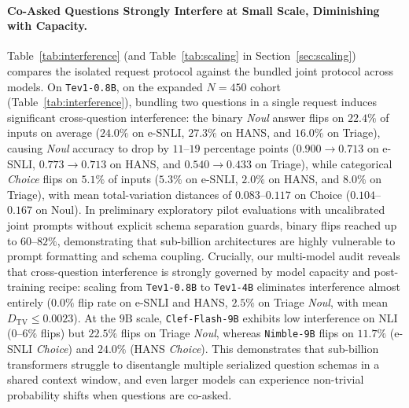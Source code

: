 \documentclass[10pt]{article}
\begin{document}
\paragraph{Co-Asked Questions Strongly Interfere at Small Scale, Diminishing with Capacity.}
Table~\ref{tab:interference} (and Table~\ref{tab:scaling} in Section~\ref{sec:scaling}) compares the isolated request protocol against the bundled joint protocol across models.
On \texttt{Tev1-0.8B}, on the expanded $N=450$ cohort (Table~\ref{tab:interference}), bundling two questions in a single request induces significant cross-question interference: the binary \emph{Noul} answer flips on $22.4\%$ of inputs on average ($24.0\%$ on e-SNLI, $27.3\%$ on HANS, and $16.0\%$ on Triage), causing \emph{Noul} accuracy to drop by $11$--$19$ percentage points ($0.900 \to 0.713$ on e-SNLI, $0.773 \to 0.713$ on HANS, and $0.540 \to 0.433$ on Triage), while categorical \emph{Choice} flips on $5.1\%$ of inputs ($5.3\%$ on e-SNLI, $2.0\%$ on HANS, and $8.0\%$ on Triage), with mean total-variation distances of $0.083$--$0.117$ on Choice ($0.104$--$0.167$ on Noul).
In preliminary exploratory pilot evaluations with uncalibrated joint prompts without explicit schema separation guards, binary flips reached up to $60$--$82\%$, demonstrating that sub-billion architectures are highly vulnerable to prompt formatting and schema coupling.
Crucially, our multi-model audit reveals that cross-question interference is strongly governed by model capacity and post-training recipe: scaling from \texttt{Tev1-0.8B} to \texttt{Tev1-4B} eliminates interference almost entirely ($0.0\%$ flip rate on e-SNLI and HANS, $2.5\%$ on Triage \emph{Noul}, with mean $D_{\text{TV}} \le 0.0023$).
At the $9\text{B}$ scale, \texttt{Clef-Flash-9B} exhibits low interference on NLI ($0$--$6\%$ flips) but $22.5\%$ flips on Triage \emph{Noul}, whereas \texttt{Nimble-9B} flips on $11.7\%$ (e-SNLI \emph{Choice}) and $24.0\%$ (HANS \emph{Choice}).
This demonstrates that sub-billion transformers struggle to disentangle multiple serialized question schemas in a shared context window, and even larger models can experience non-trivial probability shifts when questions are co-asked.

\begin{table}[t]
\centering
\caption{Interference between co-asked questions on clean inputs. ``Alone'' asks each primitive in its own request; ``joint'' asks both in one request. Flip ($\downarrow$) is the fraction of inputs whose predicted answer changes; TV ($\downarrow$) is the mean total-variation distance between the two distributions. Best values per row/source are in \textbf{bold}.}
\label{tab:interference}
\small

\end{table}
\end{document}
